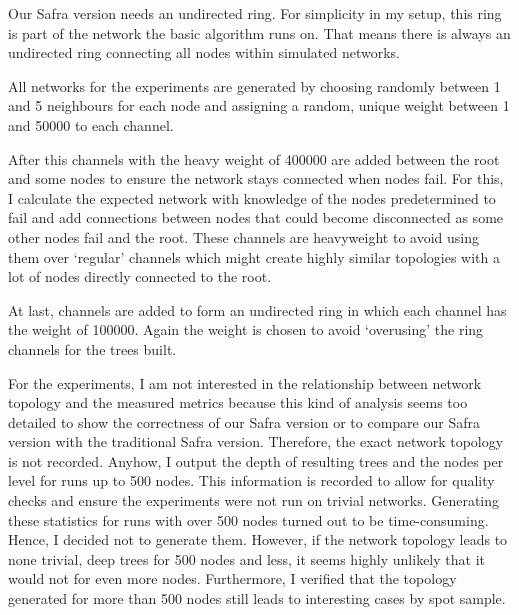Our Safra version needs an undirected ring. 
For simplicity in my setup, this ring is part of the network the basic algorithm runs on. 
That means there is always an undirected ring connecting all nodes within simulated networks.

All networks for the experiments are generated by choosing randomly between 1 and 5 neighbours for each node and assigning a random, unique weight between 1 and 50000 to each channel.

After this channels with the heavy weight of 400000 are added between the root and some nodes to ensure the network stays connected when nodes fail.
For this, I calculate the expected network with knowledge of the nodes predetermined to fail and add connections between nodes that could become disconnected as some other nodes fail and the root.
These channels are heavyweight to avoid using them over `regular' channels which might create highly similar topologies with a lot of nodes directly connected to the root.

At last, channels are added to form an undirected ring in which each channel has the weight of 100000. 
Again the weight is chosen to avoid `overusing' the ring channels for the trees built.

For the experiments, I am not interested in the relationship between network topology and the measured metrics because this kind of analysis seems too detailed to show the correctness of our Safra version or to compare
our Safra version with the traditional Safra version.
Therefore, the exact network topology is not recorded. 
Anyhow, I output the depth of resulting trees and the nodes per level for runs up to 500 nodes.
This information is recorded to allow for quality checks and ensure the experiments were not run on trivial networks.
Generating these statistics for runs with over 500 nodes turned out to be time-consuming.
Hence, I decided not to generate them.
However, if the network topology leads to none trivial, deep trees for 500 nodes and less, it seems highly unlikely that it would not for even more nodes.
Furthermore, I verified that the topology generated for more than 500 nodes still leads to interesting cases by spot sample.

